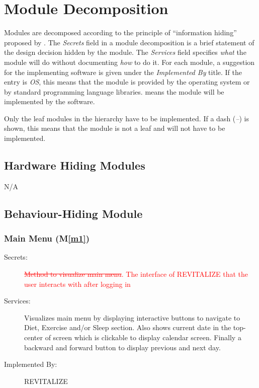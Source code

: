 \documentclass[12pt, titlepage]{article}
\newcommand{\mref}[1]{M\ref{#1}}
\begin{document}
\section{Module Decomposition} \label{SecMD}

Modules are decomposed according to the principle of ``information hiding''
proposed by \citet{ParnasEtAl1984}. The \emph{Secrets} field in a module
decomposition is a brief statement of the design decision hidden by the
module. The \emph{Services} field specifies \emph{what} the module will do
without documenting \emph{how} to do it. For each module, a suggestion for the
implementing software is given under the \emph{Implemented By} title. If the
entry is \emph{OS}, this means that the module is provided by the operating
system or by standard programming language libraries.  \emph{\progname{}} means the
module will be implemented by the \progname{} software.

Only the leaf modules in the hierarchy have to be implemented. If a dash
(\emph{--}) is shown, this means that the module is not a leaf and will not have
to be implemented.

\subsection{Hardware Hiding Modules }
N/A

\subsection{Behaviour-Hiding Module}

\subsubsection{Main Menu (\mref{m1})}
\begin{description}
	\item[Secrets:]\textcolor{red}{\sout{Method to visualize main menu}}\textcolor{red}{. The interface of REVITALIZE that the user interacts with after logging in}
	\item[Services:]Visualizes main menu by displaying interactive buttons to navigate to Diet, Exercise and/or Sleep section. Also shows current date in the top-center of screen which is clickable to display calendar screen. Finally a backward and forward button to display previous and next day.
	\item[Implemented By:] REVITALIZE
\end{description}
\end{document}
